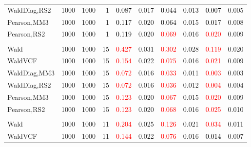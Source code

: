 \documentclass[
]{article}
\begin{document}
\begin{table}[H]
{\begin{tabular}[t]{lrrrrrrlrr}
\hspace{1em}WaldDiag,RS2 & 1000 & 1000 & 1 & \textcolor{black}{0.087} & 0.017 & \textcolor{black}{0.044} & 0.013 & \textcolor{black}{0.007} & 0.005\\
\hspace{1em}Pearson,MM3 & 1000 & 1000 & 1 & \textcolor{black}{0.117} & 0.020 & \textcolor{black}{0.064} & 0.015 & \textcolor{black}{0.017} & 0.008\\
\hspace{1em}Pearson,RS2 & 1000 & 1000 & 1 & \textcolor{black}{0.119} & 0.020 & \textcolor{red}{0.069} & 0.016 & \textcolor{red}{0.020} & 0.009\\
\addlinespace[0.3em]
\multicolumn{10}{l}{\textbf{1F 15V}}\\
\hspace{1em}Wald & 1000 & 1000 & 15 & \textcolor{red}{0.427} & 0.031 & \textcolor{red}{0.302} & 0.028 & \textcolor{red}{0.119} & 0.020\\
\hspace{1em}WaldVCF & 1000 & 1000 & 15 & \textcolor{red}{0.154} & 0.022 & \textcolor{red}{0.075} & 0.016 & \textcolor{red}{0.021} & 0.009\\
\hspace{1em}WaldDiag,MM3 & 1000 & 1000 & 15 & \textcolor{red}{0.072} & 0.016 & \textcolor{red}{0.033} & 0.011 & \textcolor{red}{0.003} & 0.003\\
\hspace{1em}WaldDiag,RS2 & 1000 & 1000 & 15 & \textcolor{red}{0.072} & 0.016 & \textcolor{red}{0.036} & 0.012 & \textcolor{red}{0.004} & 0.004\\
\hspace{1em}Pearson,MM3 & 1000 & 1000 & 15 & \textcolor{red}{0.123} & 0.020 & \textcolor{red}{0.067} & 0.015 & \textcolor{red}{0.020} & 0.009\\
\hspace{1em}Pearson,RS2 & 1000 & 1000 & 15 & \textcolor{red}{0.123} & 0.020 & \textcolor{red}{0.068} & 0.016 & \textcolor{red}{0.025} & 0.010\\
\addlinespace[0.3em]
\multicolumn{10}{l}{\textbf{2F 10V}}\\
\hspace{1em}Wald & 1000 & 1000 & 11 & \textcolor{red}{0.204} & 0.025 & \textcolor{red}{0.126} & 0.021 & \textcolor{red}{0.034} & 0.011\\
\hspace{1em}WaldVCF & 1000 & 1000 & 11 & \textcolor{red}{0.144} & 0.022 & \textcolor{red}{0.076} & 0.016 & \textcolor{black}{0.014} & 0.007\\

\end{tabular}}
\end{table}
\end{document}

